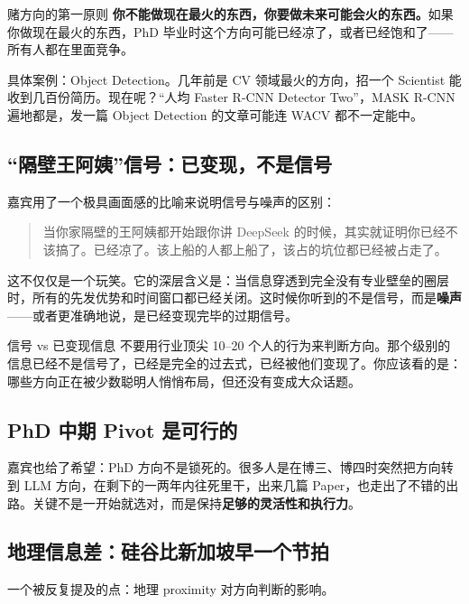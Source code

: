 \documentclass[a4paper]{article}
\begin{document}
\begin{importantbox}{赌方向的第一原则}
\textbf{你不能做现在最火的东西，你要做未来可能会火的东西。}如果你做现在最火的东西，PhD 毕业时这个方向可能已经凉了，或者已经饱和了——所有人都在里面竞争。
\end{importantbox}

具体案例：Object Detection。几年前是 CV 领域最火的方向，招一个 Scientist 能收到几百份简历。现在呢？``人均 Faster R-CNN Detector Two''，MASK R-CNN 遍地都是，发一篇 Object Detection 的文章可能连 WACV 都不一定能中。

\subsection{``隔壁王阿姨''信号：已变现，不是信号}

嘉宾用了一个极具画面感的比喻来说明信号与噪声的区别：

\begin{quote}
当你家隔壁的王阿姨都开始跟你讲 DeepSeek 的时候，其实就证明你已经不该搞了。已经凉了。该上船的人都上船了，该占的坑位都已经被占走了。
\end{quote}

这不仅仅是一个玩笑。它的深层含义是：当信息穿透到完全没有专业壁垒的圈层时，所有的先发优势和时间窗口都已经关闭。这时候你听到的不是信号，而是\textbf{噪声}——或者更准确地说，是已经变现完毕的过期信号。

\begin{warningbox}{信号 vs 已变现信息}
不要用行业顶尖 10--20 个人的行为来判断方向。那个级别的信息已经不是信号了，已经是完全的过去式，已经被他们变现了。你应该看的是：哪些方向正在被少数聪明人悄悄布局，但还没有变成大众话题。
\end{warningbox}

\subsection{PhD 中期 Pivot 是可行的}

嘉宾也给了希望：PhD 方向不是锁死的。很多人是在博三、博四时突然把方向转到 LLM 方向，在剩下的一两年内往死里干，出来几篇 Paper，也走出了不错的出路。关键不是一开始就选对，而是保持\textbf{足够的灵活性和执行力}。

\subsection{地理信息差：硅谷比新加坡早一个节拍}

一个被反复提及的点：地理 proximity 对方向判断的影响。
\end{document}
